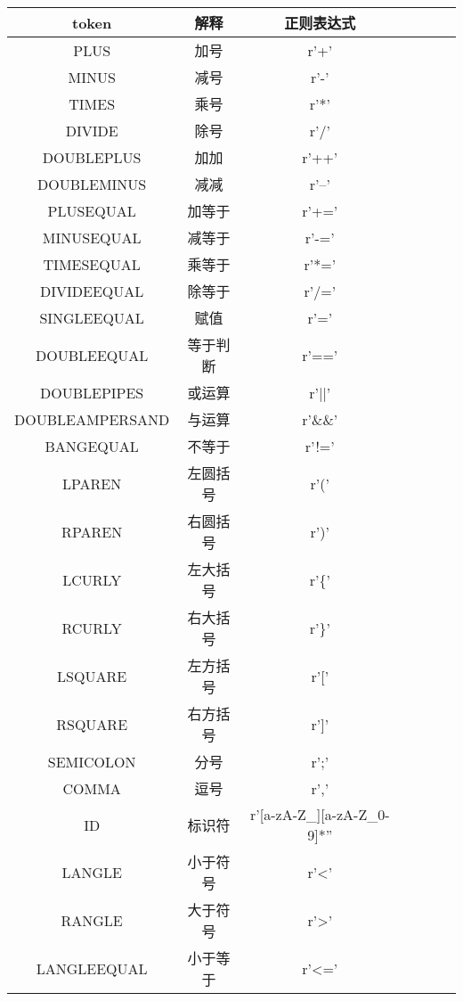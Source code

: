 \documentclass{article}
\begin{document}
\begin{table}[H]
	\centering
	\begin{tabular}{|c|c|c|c|c|c|c|}
		\hline
		\bf token  				& \bf 解释	      & \bf 正则表达式      \\\hline
		PLUS 	 				 & 加号		  & r'+'    \\\hline
		MINUS     				& 减号  &  r'-'    \\\hline
		TIMES 	 				 & 乘号		  & r'*'    \\\hline
		DIVIDE     				 & 除号  &   r'/'  \\\hline
		DOUBLEPLUS 	 	& 加加		  &  r'++'   \\\hline
		DOUBLEMINUS     & 减减  &   r'--'    \\\hline
		PLUSEQUAL 	 	 & 加等于		  & r'+='   \\\hline
		MINUSEQUAL     & 减等于  &  r'-='   \\\hline
		TIMESEQUAL 	 	& 乘等于		  & r'*='   \\\hline
		DIVIDEEQUAL     & 除等于  &  r'/='    \\\hline
		SINGLEEQUAL 	 	& 赋值		  & r'='   \\\hline
		DOUBLEEQUAL     & 等于判断  &   r'=='  \\\hline
		DOUBLEPIPES 	 	& 或运算		  &r'||'    \\\hline
		DOUBLEAMPERSAND     & 与运算  &  r'\&\&'   \\\hline
		BANGEQUAL 	 					& 不等于		  & r'!='    \\\hline
		LPAREN     				& 左圆括号  &  r'('    \\\hline		
		RPAREN 	 	& 右圆括号		  & r')'    \\\hline
		LCURLY     & 左大括号  &  r'\{'    \\\hline
		RCURLY 	 	& 右大括号		  & r'\}'    \\\hline
		LSQUARE     & 左方括号  &   r'['  \\\hline
		RSQUARE 	 	& 右方括号		  & r']'    \\\hline
		SEMICOLON     & 分号  &  r';'    \\\hline
		COMMA 	 	& 逗号		  & r','    \\\hline
		ID     & 标识符  &  r'[a-zA-Z\_][a-zA-Z\_0-9]*''    \\\hline
		LANGLE 	 	& 小于符号		  & r'<'    \\\hline
		RANGLE     & 大于符号  &  r'>'    \\\hline
		LANGLEEQUAL 	 	& 小于等于		  & r'<='    \\\hline

\end{tabular}
\end{table}
\end{document}
